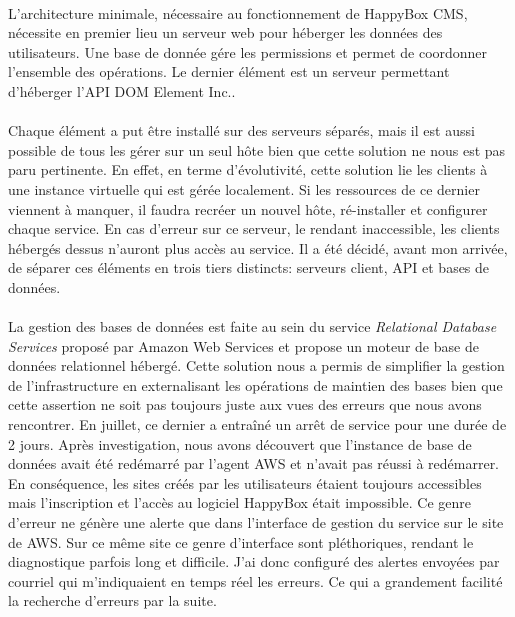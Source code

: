 \documentclass[11pt, a4paper ]{article}
\begin{document}
\begin{spacing}{1.5}
\paragraph{}
L'architecture minimale, nécessaire au fonctionnement de HappyBox CMS, nécessite en premier lieu un serveur web pour héberger les données des utilisateurs. Une base de donnée gére les permissions et permet de coordonner l'ensemble des opérations. Le dernier élément est un serveur permettant d’héberger l'API DOM Element Inc..
\paragraph{}
Chaque élément a put être installé sur des serveurs séparés, mais il est aussi possible de tous les gérer sur un seul hôte bien que cette solution ne nous est pas paru pertinente. En effet, en terme d'évolutivité, cette solution lie les clients à une instance virtuelle qui est gérée localement.
Si les ressources de ce dernier viennent à manquer, il faudra recréer un nouvel hôte, ré-installer et configurer chaque service. En cas d'erreur sur ce serveur, le rendant inaccessible, les clients hébergés dessus n'auront plus accès au service.
Il a été décidé, avant mon arrivée, de séparer ces éléments en trois tiers distincts: serveurs client, API et bases de données.
\paragraph{}
La gestion des bases de données est faite au sein du service \emph{Relational Database Services} proposé par Amazon Web Services et propose un moteur de base de données relationnel hébergé. Cette solution nous a permis de simplifier la gestion de l’infrastructure en externalisant les opérations de maintien des bases bien que cette assertion ne soit pas toujours juste aux vues des erreurs que nous avons rencontrer. En juillet, ce dernier a entraîné un arrêt de service pour une durée de 2 jours. Après investigation, nous avons découvert que l'instance de base de données avait été redémarré par l'agent AWS et n'avait pas réussi à redémarrer. En conséquence, les sites créés par les utilisateurs étaient toujours accessibles mais l'inscription et l'accès au logiciel HappyBox était impossible.
Ce genre d'erreur ne génère une alerte que dans l'interface de gestion du service sur le site de AWS. Sur ce même site ce genre d'interface sont pléthoriques, rendant le diagnostique parfois long et difficile. J'ai donc configuré des alertes envoyées par courriel qui m'indiquaient en temps réel les erreurs. Ce qui a grandement facilité la recherche d'erreurs par la suite.

\end{spacing}
\end{document}

